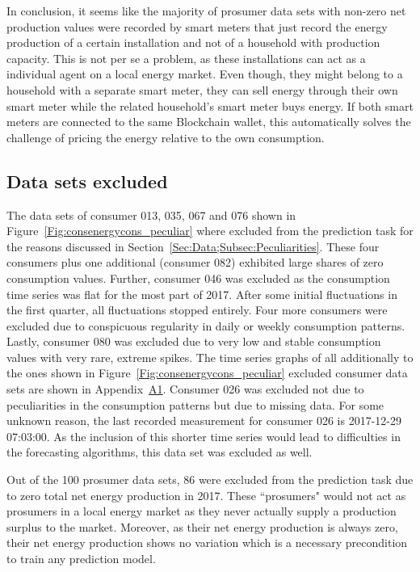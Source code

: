 In conclusion, it seems like the majority of prosumer data sets with non-zero net production values were recorded by smart meters that just record the energy production of a certain installation and not of a household with production capacity. This is not per se a problem, as these installations can act as a individual agent on a local energy market. Even though, they might belong to a household with a separate smart meter, they can sell energy through their own smart meter while the related household's smart meter buys energy. If both smart meters are connected to the same Blockchain wallet, this automatically solves the challenge of pricing the energy relative to the own consumption.


\subsection{Data sets excluded}\label{Sec:Data;Subsec:Exclusion}
The data sets of consumer 013, 035, 067 and 076 shown in Figure~\ref{Fig:consenergycons_peculiar} where excluded from the prediction task for the reasons discussed in Section~\ref{Sec:Data;Subsec:Peculiarities}. These four consumers plus one additional (consumer 082) exhibited large shares of zero consumption values. Further, consumer 046 was excluded as the consumption time series was flat for the most part of 2017. After some initial fluctuations in the first quarter, all fluctuations stopped entirely. Four more consumers were excluded due to conspicuous regularity in daily or weekly consumption patterns. Lastly, consumer 080 was excluded due to very low and stable consumption values with very rare, extreme spikes. The time series graphs of all additionally to the ones shown in Figure~\ref{Fig:consenergycons_peculiar} excluded consumer data sets are shown in Appendix~\hyperlink{AppA1:Figures:Excludedc}{A1}. Consumer 026 was excluded not due to peculiarities in the consumption patterns but due to missing data. For some unknown reason, the last recorded measurement for consumer 026 is 2017-12-29 07:03:00. As the inclusion of this shorter time series would lead to difficulties in the forecasting algorithms, this data set was excluded as well.

Out of the 100 prosumer data sets, 86 were excluded from the prediction task due to zero total net energy production in 2017. These ``prosumers" would not act as prosumers in a local energy market as they never actually supply a production surplus to the market. Moreover, as their net energy production is always zero, their net energy production shows no variation which is a necessary precondition to train any prediction model.

